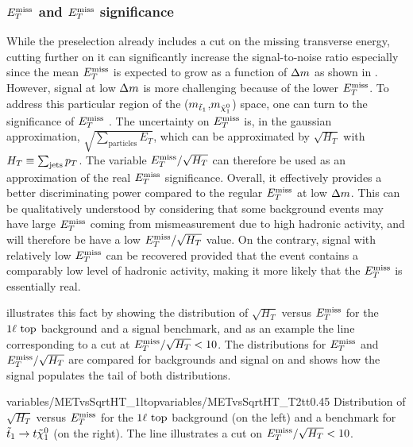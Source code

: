            \subsubsection{$E_T^\text{miss}$ and $E_T^\text{miss}$ significance}

        While the preselection already includes a cut on the missing transverse energy,
        cutting further on it can significantly increase the signal-to-noise ratio especially
        since the mean $E_T^\text{miss}$ is expected to grow as a function of $\Delta m$ as shown
        in . However, signal
        at low $\Delta m$ is more challenging because of the lower $E_T^\text{miss}$. To address this
        particular region of the ($m_{\tilde{t}_1}$,$m_{\tilde{\chi}_1^0}$) space, one
        can turn to the significance of $E_T^\text{miss}$ \cite{METperf, METsignificanceMirman}. The
        uncertainty on $E_T^\text{miss}$ is, in the gaussian approximation, $\sqrt{\sum_\text{particles} E_T}$,
        which can be approximated by $\sqrt{H_T}$ with $H_T \equiv \sum_\text{jets} p_T$.
        The variable $E_T^\text{miss} / \sqrt{H_T}$ can therefore be used as an approximation of the
        real $E_T^\text{miss}$ significance. Overall, it effectively provides a better discriminating
        power compared to the regular $E_T^\text{miss}$ at low $\Delta m$. This can be qualitatively understood
        by considering that some background events may have large $E_T^\text{miss}$ coming
        from mismeasurement due to high hadronic activity, and will therefore be have
        a low $E_T^\text{miss}/\sqrt{H_T}$ value. On the contrary, signal with relatively low $E_T^\text{miss}$
        can be recovered provided that the event contains a comparably low level of hadronic
        activity, making it more likely that the $E_T^\text{miss}$ is essentially real.

         illustrates this fact by showing the distribution of
        $\sqrt{H_T}$ versus $E_T^\text{miss}$ for the $1\ell~\text{top}$ background and a signal benchmark, and
        as an example the line corresponding to a cut at $E_T^\text{miss} / \sqrt{H_T} < 10$. The distributions
        for $E_T^\text{miss}$ and $E_T^\text{miss} / \sqrt{H_T}$ are compared for backgrounds and signal on
         and shows how the signal populates the
        tail of both distributions.

                         {variables/METvsSqrtHT_1ltop}{variables/METvsSqrtHT_T2tt}{0.45}
                         {Distribution of $\sqrt{H_T}$ versus $E_T^\text{miss}$ for the
                         $1\ell~\text{top}$ background (on the left) and a benchmark for
                         $\tilde{t}_1 \rightarrow t \tilde{\chi}_1^0$ (on the right).
                         The line illustrates a cut on $E_T^\text{miss} / \sqrt{H_T} < 10$.}

